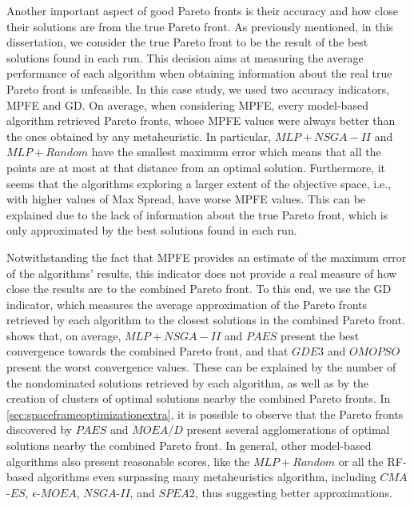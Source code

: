 Another important aspect of good Pareto fronts is their accuracy and how close their solutions are from the true Pareto front. As previously mentioned, in this dissertation, we consider the true Pareto front to be the result of the best solutions found in each run. This decision aims at measuring the average performance of each algorithm when obtaining information about the real true Pareto front is unfeasible. In this case study, we used two accuracy indicators, \ac{MPFE} and \ac{GD}. On average, when considering \ac{MPFE}, every model-based algorithm retrieved Pareto fronts, whose \ac{MPFE} values were always better than the ones obtained by any metaheuristic. In particular, $MLP+NSGA-II$ and $MLP+Random$ have the smallest maximum error which means that all the points are at most at that distance from an optimal solution. Furthermore, it seems that the algorithms exploring a larger extent of the objective space, i.e., with higher values of Max Spread, have worse \ac{MPFE} values. This can be explained due to the lack of information about the true Pareto front, which is only approximated by the best solutions found in each run. 

Notwithstanding the fact that \ac{MPFE} provides an estimate of the maximum error of the algorithms' results, this indicator does not provide a real measure of how close the results are to the combined Pareto front. To this end, we use the \ac{GD} indicator, which measures the average approximation of the Pareto fronts retrieved by each algorithm to the closest solutions in the combined Pareto front.  shows that, on average, $MLP+NSGA-II$ and $PAES$ present the best convergence towards the combined Pareto front, and that $GDE3$ and $OMOPSO$ present the worst convergence values. These can be explained by the number of the nondominated solutions retrieved by each algorithm, as well as by the creation of clusters of optimal solutions nearby the combined Pareto fronts. In \cref{sec:spaceframeoptimizationextra}, it is possible to observe that the Pareto fronts discovered by $PAES$ and $MOEA/D$ present several agglomerations of optimal solutions nearby the combined Pareto front. In general, other model-based algorithms also present reasonable scores, like the $MLP+Random$ or all the \ac{RF}-based algorithms even surpassing many metaheuristics algorithm, including $CMA$-$ES$, $\epsilon$-$MOEA$, $NSGA$-$II$, and $SPEA2$, thus suggesting better approximations.

